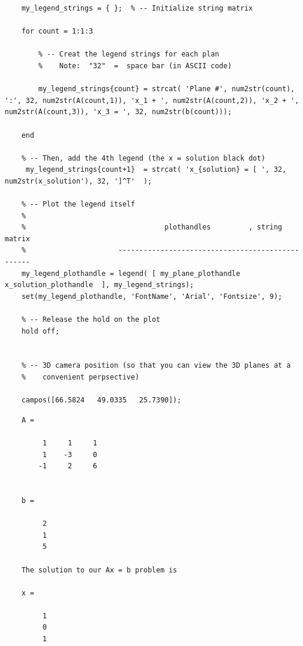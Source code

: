 \documentclass{article}
\begin{document}
\begin{verbatim}
    my_legend_strings = { };  % -- Initialize string matrix
    
    for count = 1:1:3
    
        % -- Creat the legend strings for each plan
        %    Note:  "32"  =  space bar (in ASCII code)
    
        my_legend_strings{count} = strcat( 'Plane #', num2str(count), ':', 32, num2str(A(count,1)), 'x_1 + ', num2str(A(count,2)), 'x_2 + ', num2str(A(count,3)), 'x_3 = ', 32, num2str(b(count)));
    
    end
    
    % -- Then, add the 4th legend (the x = solution black dot)
     my_legend_strings{count+1}  = strcat( 'x_{solution} = [ ', 32, num2str(x_solution'), 32, ']^T'  );
    
    % -- Plot the legend itself
    %
    %                                 plothandles         , string matrix
    %                      -------------------------------------------------
    my_legend_plothandle = legend( [ my_plane_plothandle   x_solution_plothandle  ], my_legend_strings);
    set(my_legend_plothandle, 'FontName', 'Arial', 'Fontsize', 9);
    
    % -- Release the hold on the plot
    hold off;
    
    
    % -- 3D camera position (so that you can view the 3D planes at a
    %    convenient perpsective)
    
    campos([66.5824   49.0335   25.7390]);
    \end{verbatim}

\color{lightgray} \begin{verbatim}
    A =
    
         1     1     1
         1    -3     0
        -1     2     6
    
    
    b =
    
         2
         1
         5
    
    The solution to our Ax = b problem is
    
    x =
    
         1
         0
         1
    
    \end{verbatim}
\color{black}
\end{document}
